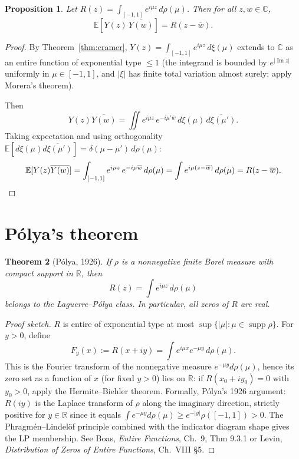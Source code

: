 \documentclass[11pt]{article}
\newtheorem{theorem}{Theorem}
\newtheorem{proposition}[theorem]{Proposition}
\theoremstyle{definition}
\theoremstyle{remark}
\newcommand{\R}{\mathbb{R}}
\newcommand{\C}{\mathbb{C}}
\newcommand{\E}{\mathbb{E}}
\DeclareMathOperator{\supp}{supp}
\DeclareMathOperator{\Imag}{Im}
\begin{document}
\begin{proposition}\label{prop:reproducing}
Let $R(z) = \int_{[-1,1]} e^{i\mu z}\, d\rho(\mu)$. Then for all $z, w \in \C$,
\[
\E[Y(z)\,\overline{Y(w)}] = R(z - \overline w).
\]
\end{proposition}

\begin{proof}
By Theorem~\ref{thm:cramer}, $Y(z) = \int_{[-1,1]} e^{i\mu z}\, d\xi(\mu)$ extends to $\C$ as an entire function of exponential type $\leq 1$ (the integrand is bounded by $e^{|\Imag z|}$ uniformly in $\mu \in [-1,1]$, and $|\xi|$ has finite total variation almost surely; apply Morera's theorem).

Then
\[
Y(z)\overline{Y(w)} = \iint e^{i\mu z}\, e^{-i\mu'\overline w}\, d\xi(\mu)\,\overline{d\xi(\mu')}.
\]
Taking expectation and using orthogonality $\E[d\xi(\mu)\overline{d\xi(\mu')}] = \delta(\mu-\mu')\,d\rho(\mu)$:
\[
\E[Y(z)\overline{Y(w)}] = \int_{[-1,1]} e^{i\mu z}\,e^{-i\mu\overline w}\, d\rho(\mu) = \int e^{i\mu(z-\overline w)}\,d\rho(\mu) = R(z-\overline w). \qedhere
\]
\end{proof}

\section{P\'olya's theorem}

\begin{theorem}[P\'olya, 1926]\label{thm:polya}
If $\rho$ is a nonnegative finite Borel measure with compact support in $\R$, then
\[
R(z) = \int e^{i\mu z}\, d\rho(\mu)
\]
belongs to the Laguerre--P\'olya class. In particular, all zeros of $R$ are real.
\end{theorem}

\begin{proof}[Proof sketch]
$R$ is entire of exponential type at most $\sup\{|\mu|:\mu\in\supp\rho\}$. For $y > 0$, define
\[
F_y(x) := R(x + iy) = \int e^{i\mu x}e^{-\mu y}\, d\rho(\mu).
\]
This is the Fourier transform of the nonnegative measure $e^{-\mu y}d\rho(\mu)$, hence its zero set as a function of $x$ (for fixed $y > 0$) lies on $\R$: if $R(x_0 + iy_0) = 0$ with $y_0 > 0$, apply the Hermite--Biehler theorem. Formally, P\'olya's 1926 argument: $R(iy)$ is the Laplace transform of $\rho$ along the imaginary direction, strictly positive for $y \in \R$ since it equals $\int e^{-\mu y}d\rho(\mu) \geq e^{-|y|}\rho([-1,1]) > 0$. The Phragm\'en--Lindel\"of principle combined with the indicator diagram shape gives the LP membership. See Boas, \emph{Entire Functions}, Ch.~9, Thm 9.3.1 or Levin, \emph{Distribution of Zeros of Entire Functions}, Ch.~VIII §5.
\end{proof}
\end{document}
